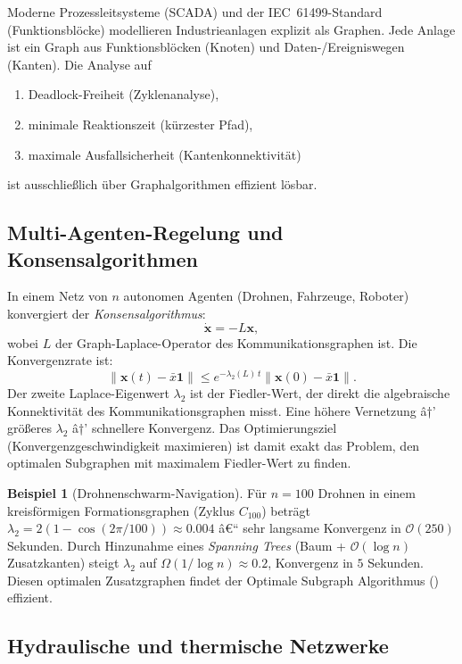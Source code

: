 ﻿\documentclass[12pt,a4paper,twoside]{article}
\theoremstyle{definition}
\newtheorem{beispiel}{Beispiel}[section]
\theoremstyle{plain}
\theoremstyle{remark}
\begin{document}
Moderne Prozessleitsysteme (SCADA) und der IEC~61499-Standard
(Funktionsblöcke) modellieren Industrieanlagen explizit als
Graphen.  Jede Anlage ist ein Graph aus Funktionsblöcken (Knoten)
und Daten-/Ereigniswegen (Kanten).  Die Analyse auf
\begin{enumerate}
  \item Deadlock-Freiheit (Zyklenanalyse),
  \item minimale Reaktionszeit (kürzester Pfad),
  \item maximale Ausfallsicherheit (Kantenkonnektivität)
\end{enumerate}
ist ausschließlich über Graphalgorithmen effizient lösbar.

\subsection{Multi-Agenten-Regelung und Konsensalgorithmen}

In einem Netz von $n$ autonomen Agenten (Drohnen, Fahrzeuge,
Roboter) konvergiert der \emph{Konsensalgorithmus}:
\[
  \dot{\mathbf{x}} = -L\mathbf{x},
\]
wobei $L$ der Graph-Laplace-Operator des Kommunikationsgraphen
ist.  Die Konvergenzrate ist:
\[
  \|\mathbf{x}(t) - \bar{x}\mathbf{1}\| \leq
  e^{-\lambda_2(L)\, t} \|\mathbf{x}(0) - \bar{x}\mathbf{1}\|.
\]
Der zweite Laplace-Eigenwert $\lambda_2$ ist der Fiedler-Wert,
der direkt die algebraische Konnektivität des Kommunikationsgraphen
misst. Eine höhere Vernetzung â†’ größeres $\lambda_2$ â†’
schnellere Konvergenz. Das Optimierungsziel (Konvergenz\-geschwindigkeit
maximieren) ist damit exakt das Problem, den optimalen
Subgraphen mit maximalem Fiedler-Wert zu finden.

\begin{beispiel}[Drohnenschwarm-Navigation]
Für $n=100$ Drohnen in einem kreisförmigen Formationsgraphen
(Zyklus $C_{100}$) beträgt $\lambda_2 = 2(1-\cos(2\pi/100))
\approx 0.004$ â€“ sehr langsame Konvergenz in $\mathcal{O}(250)$
Sekunden.  Durch Hinzunahme eines \emph{Spanning Trees} (Baum +
$\mathcal{O}(\log n)$ Zusatzkanten) steigt $\lambda_2$ auf
$\Omega(1/\log n) \approx 0.2$, Konvergenz in $5$ Sekunden.
Diesen optimalen Zusatzgraphen findet der Optimale
Subgraph Algorithmus () effizient.
\end{beispiel}

\subsection{Hydraulische und thermische Netzwerke}
\end{document}
